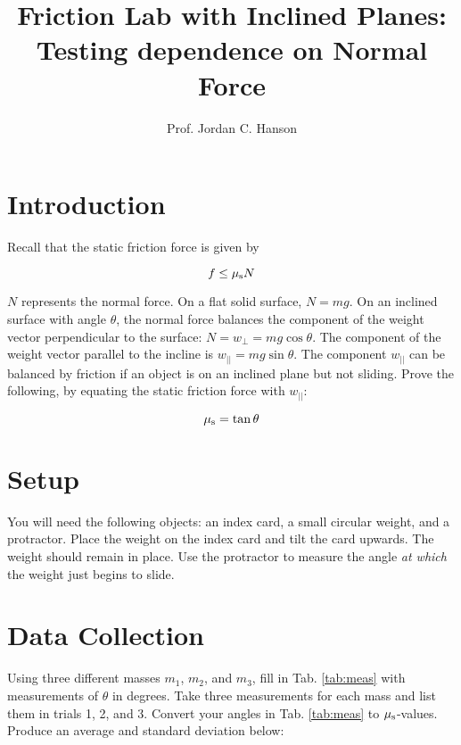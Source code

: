 \documentclass{article}
\begin{document}
\title{Friction Lab with Inclined Planes: Testing dependence on Normal Force}
\author{Prof. Jordan C. Hanson}

\maketitle

\section{Introduction}

Recall that the static friction force is given by

\begin{equation}
f \leq \mu_{\rm s} N
\end{equation}

$N$ represents the normal force.  On a flat solid surface, $N = mg$.  On an inclined surface with angle $\theta$, the normal force balances the component of the weight vector perpendicular to the surface: $N = w_{\perp} = mg \cos\theta$.  The component of the weight vector parallel to the incline is $w_{||} = mg \sin\theta$.  The component $w_{||}$ can be balanced by friction if an object is on an inclined plane but not sliding.  Prove the following, by equating the static friction force with $w_{||}$:

\begin{equation}
\mu_{\rm s} = \tan\theta
\end{equation}

\section{Setup}

You will need the following objects: an index card, a small circular weight, and a protractor.  Place the weight on the index card and tilt the card upwards. The weight should remain in place.  Use the protractor to measure the angle \textit{at which} the weight just begins to slide.

\section{Data Collection}

Using three different masses $m_1$, $m_2$, and $m_3$, fill in Tab. \ref{tab:meas} with measurements of $\theta$ in degrees.  Take three measurements for each mass and list them in trials 1, 2, and 3.  Convert your angles in Tab. \ref{tab:meas} to $\mu_{\rm s}$-values.  Produce an average and standard deviation below: \\ \\
\end{document}
